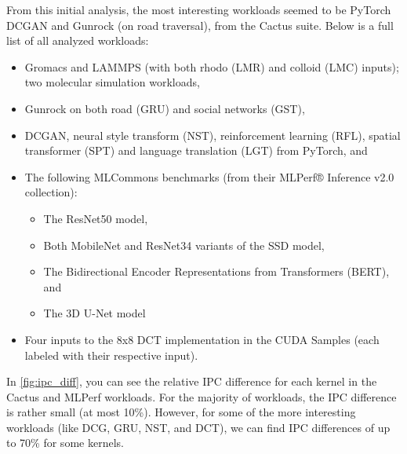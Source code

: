 From this initial analysis, the most interesting workloads seemed to be PyTorch DCGAN\cite{dcgan} and Gunrock\cite{gru} (on road traversal), from the Cactus\cite{cactus} suite.
Below is a full list of all analyzed workloads:
\begin{itemize}
    \item Gromacs\cite{gromacs} and LAMMPS\cite{LAMMPS} (with both rhodo (LMR) and colloid (LMC) inputs); two molecular simulation workloads,
    \item Gunrock on both road (GRU) and social networks (GST),
    \item DCGAN, neural style transform (NST)\cite{nst}, reinforcement learning (RFL), spatial transformer (SPT)\cite{spt} and language translation (LGT) from PyTorch, and
    \item The following MLCommons benchmarks (from their MLPerf® Inference v2.0 collection):
    \begin{itemize}
        \item The ResNet50 model\cite{resnet50},
        \item Both MobileNet and ResNet34 variants of the SSD model,
        \item The Bidirectional Encoder Representations from Transformers (BERT)\cite{bert}, and
        \item The 3D U-Net model\cite{3d-unet}
    \end{itemize}
    \item Four inputs to the 8x8 DCT implementation in the CUDA Samples (each labeled with their respective input).
\end{itemize}

In \cref{fig:ipc_diff}, you can see the relative IPC difference for each kernel in the Cactus and MLPerf workloads.
For the majority of workloads, the IPC difference is rather small (at most 10\%).
However, for some of the more interesting workloads (like DCG, GRU, NST, and DCT), we can find IPC differences of up to 70\% for some kernels.
\FloatBarrier

